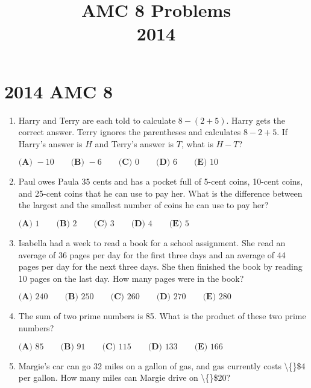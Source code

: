 \documentclass{article}
\title{AMC 8 Problems \\ 2014}
\date{}
\begin{document}
\maketitle\thispagestyle{fancy}\newpage\section*{2014 AMC 8}\begin{enumerate}[label=\arabic*., itemsep=0.5em]\item Harry and Terry are each told to calculate \(8 - (2 + 5)\). Harry gets the correct answer. Terry ignores the parentheses and calculates \(8 - 2 + 5\). If Harry's answer is \(H\) and Terry's answer is \(T\), what is \(H - T\)?

\(\textbf{(A) }-10\qquad\textbf{(B) }-6\qquad\textbf{(C) }0\qquad\textbf{(D) }6\qquad \textbf{(E) }10\)\par \vspace{0.5em}\item Paul owes Paula 35 cents and has a pocket full of 5-cent coins, 10-cent coins, and 25-cent coins that he can use to pay her. What is the difference between the largest and the smallest number of coins he can use to pay her?

\(\textbf{(A) }1\qquad\textbf{(B) }2\qquad\textbf{(C) }3\qquad\textbf{(D) }4\qquad \textbf{(E) }5\)\par \vspace{0.5em}\item Isabella had a week to read a book for a school assignment. She read an average of 36 pages per day for the first three days and an average of 44 pages per day for the next three days. She then finished the book by reading 10 pages on the last day. How many pages were in the book?

\(\textbf{(A) }240\qquad\textbf{(B) }250\qquad\textbf{(C) }260\qquad\textbf{(D) }270\qquad \textbf{(E) }280\)\par \vspace{0.5em}\item The sum of two prime numbers is 85. What is the product of these two prime numbers?

\(\textbf{(A) }85\qquad\textbf{(B) }91\qquad\textbf{(C) }115\qquad\textbf{(D) }133\qquad \textbf{(E) }166\)\par \vspace{0.5em}\item Margie's car can go 32 miles on a gallon of gas, and gas currently costs \textbackslash\{\}\$4 per gallon. How many miles can Margie drive on \textbackslash\{\}\$20?


\end{enumerate}
\end{document}
